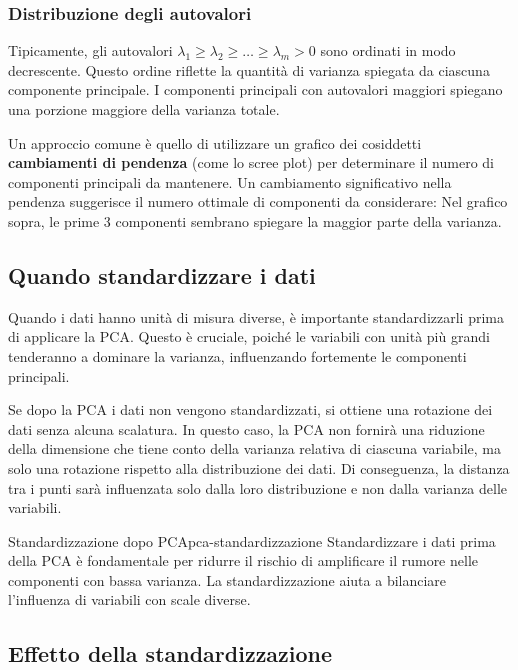 \subsubsection{Distribuzione degli autovalori}

Tipicamente, gli autovalori \( \lambda_1 \geq \lambda_2 \geq \dots \geq
\lambda_m > 0 \) sono ordinati in modo decrescente. Questo ordine riflette la
quantità di varianza spiegata da ciascuna componente principale. I componenti
principali con autovalori maggiori spiegano una porzione maggiore della varianza
totale.

Un approccio comune è quello di utilizzare un grafico dei cosiddetti
\textbf{cambiamenti di pendenza} (come lo scree plot) per determinare il numero
di componenti principali da mantenere. Un cambiamento significativo nella
pendenza suggerisce il numero ottimale di componenti da considerare:
Nel grafico sopra, le prime 3 componenti sembrano spiegare la maggior parte
della varianza.

\subsection{Quando standardizzare i dati}

Quando i dati hanno unità di misura diverse, è importante standardizzarli
prima di applicare la PCA. Questo è cruciale, poiché le variabili con unità
più grandi tenderanno a dominare la varianza, influenzando fortemente le
componenti principali.

Se dopo la PCA i dati non vengono standardizzati, si ottiene una rotazione dei
dati senza alcuna scalatura. In questo caso, la PCA non fornirà una riduzione
della dimensione che tiene conto della varianza relativa di ciascuna variabile,
ma solo una rotazione rispetto alla distribuzione dei dati. Di conseguenza, la
distanza tra i punti sarà influenzata solo dalla loro distribuzione e non dalla
varianza delle variabili.

\begin{nota}{Standardizzazione dopo PCA}{pca-standardizzazione}
Standardizzare i dati prima della PCA è fondamentale per ridurre il rischio di
amplificare il rumore nelle componenti con bassa varianza. La standardizzazione
aiuta a bilanciare l'influenza di variabili con scale diverse.
\end{nota}

\subsection{Effetto della standardizzazione}

